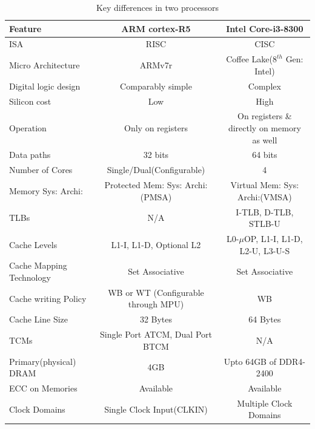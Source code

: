 \documentclass[a4paper,11pt]{article}
\begin{document}
\begin{table}[!h]
	\centering
	\begin{tabular}{l ||c| c }
		\textbf{Feature} &\textbf{ARM cortex-R5}&\textbf{Intel Core-i3-8300}\\\hline
		ISA &RISC&CISC\\
		Micro Architecture &ARMv7r&Coffee Lake($8^{th}$ Gen: Intel)\\
		Digital logic design&	Comparably simple	&Complex\\
		Silicon cost&	Low	&High\\
		Operation	&Only on registers&	On registers \& directly on memory as well\\
		Data paths&	32 bits	&64 bits\\

		Number of Cores& Single/Dual(Configurable)&4\\
		Memory Sys: Archi:&Protected Mem: Sys: Archi:(PMSA)&Virtual Mem: Sys: Archi:(VMSA)\\
		TLBs&N/A&I-TLB, D-TLB, STLB-U\\
		Cache  Levels& L1-I, L1-D, Optional L2  & L0-$\mu$OP, L1-I,   L1-D, L2-U, L3-U-S\\
		Cache Mapping Technology&Set Associative&Set Associative\\
		Cache writing Policy&WB or WT (Configurable through MPU)& WB\\
		Cache Line Size&32 Bytes&64 Bytes\\
		TCMs&Single Port ATCM, Dual Port BTCM&N/A\\
		Primary(physical) DRAM& 4GB&Upto 64GB of DDR4-2400\\
		ECC on Memories& Available& Available\\
		Clock Domains& Single Clock Input(CLKIN)&Multiple Clock Domains\\


		\hline\hline
	\end{tabular}
	\caption{Key differences in two processors}
\end{table}





\end{document}
